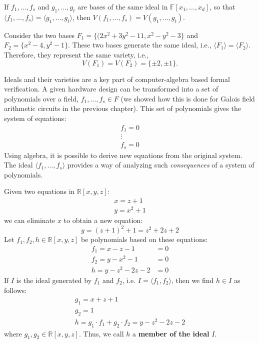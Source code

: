 \begin{Proposition}
If $f_1,\dots,f_{s}$ and $g_{1},\dots,g_{t}$ are bases of the same ideal 
in $\mathbb{F}[x_{1},\dots,x_{d}]$,
so that $\langle f_{1},\dots,f_{s}\rangle=\langle g_{1},\dots,g_{t}\rangle$, 
then $V(f_{1},\dots,f_{s})=V(g_{1},\dots,g_{t})$.
\end{Proposition}

\begin{Example}
	Consider the two bases $F_{1}=\{(2x^{2}+3y^{2}-11,x^{2}-y^{2}-3\}$ and $F_{2}=\{x^{2}-4,y^{2}-1\}$.
	These two bases generate the same ideal, i.e., $\langle F_{1}\rangle= \langle F_{2} \rangle$.{}
	Therefore, they represent the same variety, i.e., 
	\begin{equation}
		V(F_{1})= V( F_{2})=\{\pm 2, \pm 1\}.
	\end{equation}
\end{Example}

Ideals and their varieties are a key part of computer-algebra based formal
verification. A given hardware design can be transformed into a set
of polynomials over a field, $f_1, \ldots, f_s \in F$ 
(we showed how this is done for Galois field arithmetic 
circuits in the previous chapter).
This set of polynomials gives the system of equations:
\begin{eqnarray}
f_1 = 0 \nonumber \\
\vdots \nonumber \\
f_s = 0 \nonumber
\end{eqnarray}
Using algebra, it is possible to derive new equations from the original 
system.
The ideal $\langle f_1,\ldots, f_s \rangle$ provides a way of analyzing 
such {\it consequences} of a system of polynomials.

\begin{Example}
Given two equations in $\mathbb{R}[x,y,z]$:
\begin{eqnarray}
x=z+1 \nonumber \\
y=x^2+1 \nonumber 
\end{eqnarray}
we can eliminate $x$ to obtain a new equation:
\begin{equation}
y=(z+1)^2+1=z^2+2z+2 \nonumber 
\end{equation}
Let $f_1, f_2, h \in \mathbb{R}[x,y,z]$ be polynomials based on these 
equations:
\begin{eqnarray}
f_1 = x-z-1 &= 0 \nonumber \\
f_2 = y-x^2-1 &= 0 \nonumber \\
h   = y-z^2-2z-2 &= 0 \nonumber
\end{eqnarray}
If $I$ is the ideal generated by $f_1$ and $f_2$, i.e. 
$I=\langle f_1, f_2 \rangle$, then we find $h \in I$ as follows:
\begin{eqnarray}
g_1 = x+z+1 \nonumber \\
g_2 = 1     \nonumber \\
h = g_1\cdot f_1+g_2\cdot f_2  = y-z^2-2z-2 \nonumber
\end{eqnarray}
where $g_1, g_2 \in \mathbb{R}[x,y,z]$.
Thus, we call $h$ a {\bf member of the ideal} $I$.
\end{Example}

